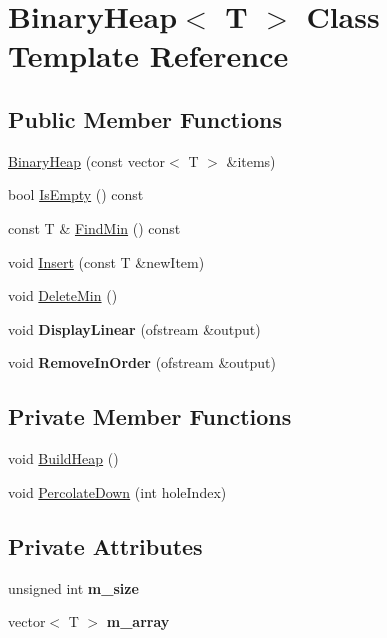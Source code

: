 \hypertarget{classBinaryHeap}{}\section{Binary\+Heap$<$ T $>$ Class Template Reference}
\label{classBinaryHeap}
\subsection*{Public Member Functions}
\begin{DoxyCompactItemize}
\item 
\hyperlink{classBinaryHeap_a5c1a5fa452e3a008a08b4fe0b0e4599a}{Binary\+Heap} (const vector$<$ T $>$ \&items)
\item 
bool \hyperlink{classBinaryHeap_a6bbf1a12804cab08943e7b0cd6afa3fb}{Is\+Empty} () const 
\item 
const T \& \hyperlink{classBinaryHeap_adbad89fb493d9c88325b2e9a5e82871a}{Find\+Min} () const 
\item 
void \hyperlink{classBinaryHeap_a0cead3dc009e8401ac1665d6b424e7e2}{Insert} (const T \&new\+Item)
\item 
void \hyperlink{classBinaryHeap_a1529b44ebc5ab9b2c6b388f2a86ae8df}{Delete\+Min} ()
\item 
void {\bfseries Display\+Linear} (ofstream \&output)\hypertarget{classBinaryHeap_a39235f9660f4cd36e38809ef8127cfef}{}\label{classBinaryHeap_a39235f9660f4cd36e38809ef8127cfef}

\item 
void {\bfseries Remove\+In\+Order} (ofstream \&output)\hypertarget{classBinaryHeap_a1e9d5143469a90a880cfd9ea6c5b5088}{}\label{classBinaryHeap_a1e9d5143469a90a880cfd9ea6c5b5088}

\end{DoxyCompactItemize}
\subsection*{Private Member Functions}
\begin{DoxyCompactItemize}
\item 
void \hyperlink{classBinaryHeap_aaaf3be9f83d101dd14f7c18a43d3d4a4}{Build\+Heap} ()
\item 
void \hyperlink{classBinaryHeap_ac52a0be1ef7171a4262019c8f00315b6}{Percolate\+Down} (int hole\+Index)
\end{DoxyCompactItemize}
\subsection*{Private Attributes}
\begin{DoxyCompactItemize}
\item 
unsigned int {\bfseries m\+\_\+size}\hypertarget{classBinaryHeap_aa213ba6c286d9c781ee58bb4fdc59779}{}\label{classBinaryHeap_aa213ba6c286d9c781ee58bb4fdc59779}

\item 
vector$<$ T $>$ {\bfseries m\+\_\+array}\hypertarget{classBinaryHeap_a189e2b7f5214172b241bef49c340f796}{}\label{classBinaryHeap_a189e2b7f5214172b241bef49c340f796}

\end{DoxyCompactItemize}


